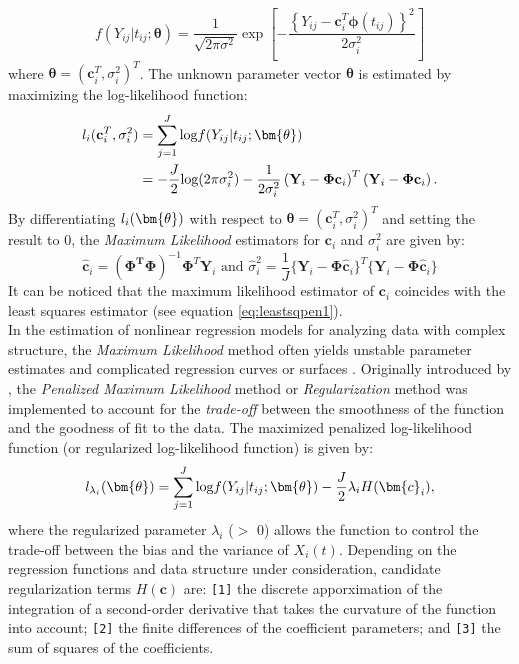 \begin{equation}\label{y_gauss}
f(Y_{ij}|t_{ij};\bm{\theta}) = \dfrac{1}{\sqrt{2\pi \sigma^2}} \exp \left[-\frac{\left\{Y_{ij}-\bm{c}^T_i \bm{\phi}(t_{ij})\right\}^2}{2\sigma_{i}^2}\right]
\end{equation}
where $\bm{\theta} = (\mathbf{c}_i^T,\sigma^2_i)^T$.
The unknown parameter vector $\bm{\theta}$ is estimated by maximizing the log-likelihood function:
\begin{align}\label{f_y}
    \text{\textit{l}}_i(\mathbf{c}_i^T,\sigma^2_i)&= \sum_{j=1}^{J}\text{log}f(Y_{ij}|t_{ij};\bm{\theta}) \nonumber \\
                    &=-\dfrac{J}{2}\text{log}(2\pi \sigma^2_i)-\dfrac{1}{2 \sigma_i^2}\left(\mathbf{Y}_i-\mathbf{\Phi}\mathbf{c}_i\right)^T\left(\mathbf{Y}_i-\mathbf{\Phi}\mathbf{c}_i\right).
    \end{align}
By differentiating $\text{\textit{l}}_i(\bm{\theta})$ with respect to $\bm{\theta} = (\mathbf{c}_i^T,\sigma^2_i)^T$ and setting the result to $0$, the \textit{Maximum Likelihood} estimators for $\bm{c}_i$ and $\sigma^2_i$ are given by:
\begin{equation}
\bm{\hat{c}}_i=(\bm{\Phi^T\Phi })^{-1}\bm{\Phi}^T\bm{Y}_i \text{  and  } \hat{\sigma}^2_i = \dfrac{1}{J}\{\mathbf{Y}_i-\mathbf{\Phi}\bm{\hat{c}}_i\}^T\{\mathbf{Y}_i-\mathbf{\Phi}\bm{\hat{c}}_i\}
\end{equation}
It can be noticed that the maximum likelihood estimator of $\bm{c}_i$ coincides with the least squares estimator (see equation \eqref{eq:leastsqpen1}).\\
In the estimation of nonlinear regression models for analyzing data with complex structure, the \textit{Maximum Likelihood} method often yields unstable parameter estimates and complicated regression curves or surfaces \citep{konishikit2008}. Originally introduced by \cite{GoodGaskins1971}, the \textit{Penalized Maximum Likelihood} method or \textit{Regularization} method was implemented to account for the \textit{trade-off} between the smoothness of the function and the goodness of fit to the data. The maximized penalized log-likelihood function (or regularized log-likelihood function) is given by:
\begin{equation} \label{penloglik}
\text{\textit{l}}_{\lambda_i}(\bm{\theta})= \sum_{j=1}^{J}\text{log}f(Y_{ij}|t_{ij};\bm{\theta})-\dfrac{J}{2}\lambda_i H(\bm{c}_i),
\end{equation}
where the regularized parameter $\lambda_i$ ($>$ 0) allows the function to control the trade-off between the bias and the variance of $X_i(t)$. Depending on the regression functions and data structure under consideration, candidate regularization terms $H(\bm{c})$ are: \texttt{[1]} the discrete apporximation of the integration of a second-order derivative that takes the curvature of the function into account; \texttt{[2]} the finite differences of the coefficient parameters; and \texttt{[3]} the sum of squares of the coefficients. \\ 
